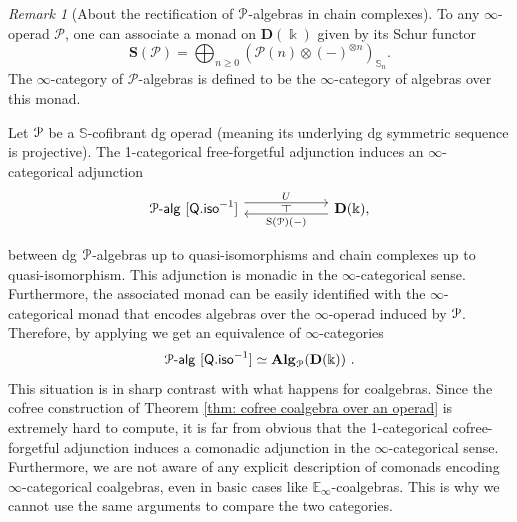 \documentclass[a4paper,12pt]{amsart}
\renewcommand{\mathcal}{\EuScript}
\newcommand{\onepalg}{\mathcal{P}\text{-}\mathsf{alg}}
\theoremstyle{plain}
\theoremstyle{definition}
\theoremstyle{remark}
\newtheorem{remark}[theorem]{\sc Remark}%
\newcommand{\kk}{\Bbbk}
\begin{document}
\begin{remark}[About the rectification of $\mathcal{P}$-algebras in chain complexes]
To any $\infty$-operad $\mathscr{P}$, one can associate a monad on $\mathbf{D}(\kk)$ given by its Schur functor 
\[
\mathbf{S}(\mathscr{P}) = \bigoplus_{n \geq 0} \left(\mathscr{P}(n) \otimes (-)^{\otimes n}\right)_{\mathbb{S}_n}.
\]
The $\infty$-category of $\mathscr{P}$-algebras is defined to be the $\infty$-category of algebras over this monad. 


Let $\mathcal{P}$ be a $\mathbb{S}$-cofibrant dg operad (meaning its underlying dg symmetric sequence is projective). The  1-categorical free-forgetful adjunction induces an $\infty$-categorical adjunction 
\[
\begin{tikzcd}[column sep=5pc,row sep=3pc]
          \onepalg~[\mathsf{Q.iso}^{-1}] \arrow[r, shift left=1.1ex, "U"{name=F}] & \mathbf{D}(\kk), \arrow[l, shift left=.75ex, "\mathrm{S}(\mathcal{P})(-)"{name=U}]
            \arrow[phantom, from=F, to=U, , "\dashv" rotate=90]
\end{tikzcd}
\]

between dg $\mathcal{P}$-algebras up to quasi-isomorphisms and chain complexes up to quasi-isomorphism. This adjunction is monadic in the $\infty$-categorical sense. Furthermore, the associated monad can be easily identified with the $\infty$-categorical monad that encodes algebras over the $\infty$-operad induced by $\mathcal{P}$. Therefore, by applying \cite[Theorem 4.7.3.5]{HigherAlgebra} we get an equivalence of $\infty$-categories
\[
\onepalg~[\mathsf{Q.iso}^{-1}] \simeq \mathbf{Alg}_{\mathcal{P}}(\mathbf{D}(\kk))~. 
\]
This situation is in sharp contrast with what happens for coalgebras. Since the cofree construction of Theorem \ref{thm: cofree coalgebra over an operad} is extremely hard to compute, it is far from obvious that the 1-categorical cofree-forgetful adjunction induces a comonadic adjunction in the $\infty$-categorical sense. Furthermore, we are not aware of any explicit description of comonads encoding $\infty$-categorical coalgebras, even in basic cases like $\mathbb{E}_\infty$-coalgebras. This is why we cannot use the same arguments to compare the two categories.
\end{remark}
\end{document}

